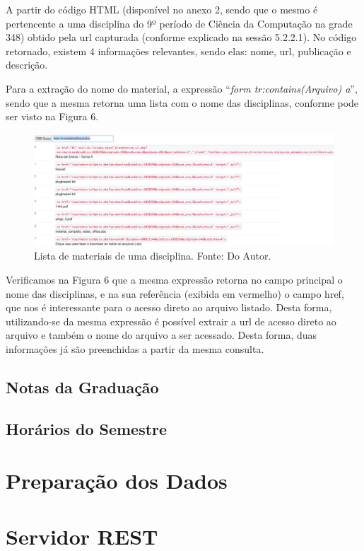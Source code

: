 A partir do código HTML (disponível no anexo 2, sendo que o mesmo é pertencente a uma disciplina do 9º período de Ciência da Computação na grade 348) obtido pela url capturada (conforme explicado na sessão 5.2.2.1). No código retornado, existem 4 informações relevantes, sendo elas: nome, url, publicação e descrição.

Para a extração do nome do material, a expressão ``\emph{form tr:contains(Arquivo) a}'', sendo que a mesma retorna uma lista com o nome das disciplinas, conforme pode ser visto na Figura 6.

\begin{figure}[!htb]
     \centering
     \includegraphics[scale=0.35]{imagens/listamateriaisdisciplinasnomematerial.png}
     \caption[Extração de Informações - Lista dos Materiais de uma disciplina]{Lista de materiais de uma disciplina. Fonte: Do Autor.}
\end{figure}

Verificamos na Figura 6 que a mesma expressão retorna no campo principal o nome das disciplinas, e na sua referência (exibida em vermelho) o campo href, que nos é interessante para o acesso direto ao arquivo listado. Desta forma, utilizando-se da mesma expressão é possível extrair a url de acesso direto ao arquivo e também o nome do arquivo a ser acessado. Desta forma, duas informações já são preenchidas a partir da mesma consulta. 



\subsection{Notas da Graduação}

\subsection{Horários do Semestre}


\section{Preparação dos Dados}

\section{Servidor REST}
